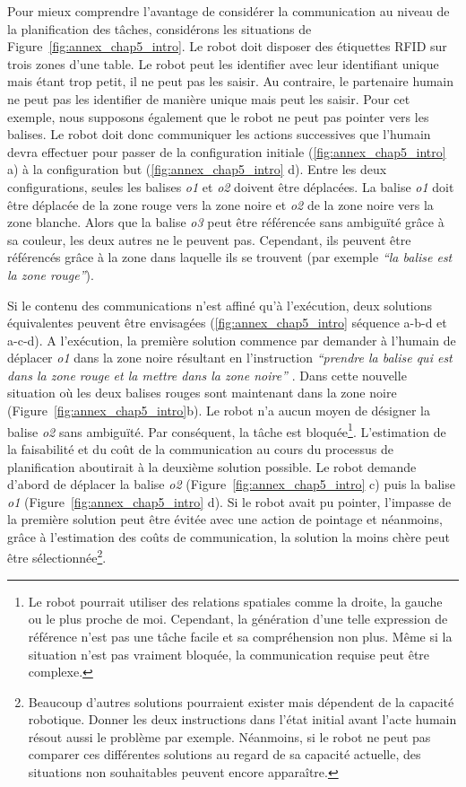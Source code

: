 Pour mieux comprendre l'avantage de considérer la communication au niveau de la planification des tâches, considérons les situations de Figure~\ref{fig:annex_chap5_intro}. Le robot doit disposer des étiquettes RFID sur trois zones d'une table. Le robot peut les identifier avec leur identifiant unique mais étant trop petit, il ne peut pas les saisir. Au contraire, le partenaire humain ne peut pas les identifier de manière unique mais peut les saisir. Pour cet exemple, nous supposons également que le robot ne peut pas pointer vers les balises. Le robot doit donc communiquer les actions successives que l'humain devra effectuer pour passer de la configuration initiale (\ref{fig:annex_chap5_intro} a) à la configuration but (\ref{fig:annex_chap5_intro} d). Entre les deux configurations, seules les balises \textit{o1} et \textit{o2} doivent être déplacées. La balise \textit{o1} doit être déplacée de la zone rouge vers la zone noire et \textit{o2} de la zone noire vers la zone blanche. Alors que la balise \textit{o3} peut être référencée sans ambiguïté grâce à sa couleur, les deux autres ne le peuvent pas. Cependant, ils peuvent être référencés grâce à la zone dans laquelle ils se trouvent (par exemple \textit{``la balise est la zone rouge''}).

Si le contenu des communications n'est affiné qu'à l'exécution, deux solutions équivalentes peuvent être envisagées (\ref{fig:annex_chap5_intro} séquence a-b-d et a-c-d). A l'exécution, la première solution commence par demander à l'humain de déplacer \textit{o1} dans la zone noire résultant en l'instruction \textit{``prendre la balise qui est dans la zone rouge et la mettre dans la zone noire''} . Dans cette nouvelle situation où les deux balises rouges sont maintenant dans la zone noire (Figure~\ref{fig:annex_chap5_intro}b). Le robot n'a aucun moyen de désigner la balise \textit{o2} sans ambiguïté. Par conséquent, la tâche est bloquée\footnote{Le robot pourrait utiliser des relations spatiales comme la droite, la gauche ou le plus proche de moi. Cependant, la génération d'une telle expression de référence n'est pas une tâche facile et sa compréhension non plus. Même si la situation n'est pas vraiment bloquée, la communication requise peut être complexe. }. L'estimation de la faisabilité et du coût de la communication au cours du processus de planification aboutirait à la deuxième solution possible. Le robot demande d'abord de déplacer la balise \textit{o2} (Figure~\ref{fig:annex_chap5_intro} c) puis la balise \textit{o1} (Figure~\ref{fig:annex_chap5_intro} d). Si le robot avait pu pointer, l'impasse de la première solution peut être évitée avec une action de pointage et néanmoins, grâce à l'estimation des coûts de communication, la solution la moins chère peut être sélectionnée\footnote{Beaucoup d'autres solutions pourraient exister mais dépendent de la capacité robotique. Donner les deux instructions dans l'état initial avant l'acte humain résout aussi le problème par exemple. Néanmoins, si le robot ne peut pas comparer ces différentes solutions au regard de sa capacité actuelle, des situations non souhaitables peuvent encore apparaître.}.

